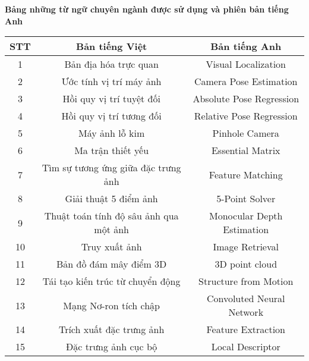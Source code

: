 \titlepage \null
	\small
	\begin{center}
	  {\bfseries Bảng những từ ngữ chuyên ngành được sử dụng và phiên bản tiếng Anh\vspace{-.5em}}
	\end{center}
	\quotation
\begin{table}[h]
\centering
\begin{tabular}{|c|c|c|}
\hline
\textbf{STT} & \textbf{Bản tiếng Việt}                & \textbf{Bản tiếng Anh}     \\ \hline
1            & Bản địa hóa trực quan                  & Visual Localization        \\ \hline
2            & Ước tính vị trí máy ảnh                & Camera Pose Estimation     \\ \hline
3            & Hồi quy vị trí tuyệt đối               & Absolute Pose Regression   \\ \hline
4            & Hồi quy vị trí tương đối               & Relative Pose Regression   \\ \hline
5            & Máy ảnh lỗ kim                         & Pinhole Camera             \\ \hline
6            & Ma trận thiết yếu                      & Essential Matrix           \\ \hline
7            & Tìm sự tương ứng giữa đặc trưng ảnh    & Feature Matching           \\ \hline
8            & Giải thuật 5 điểm ảnh                  & 5-Point Solver             \\ \hline
9            & Thuật toán tính độ sâu ảnh qua một ảnh & Monocular Depth Estimation \\ \hline
10           & Truy xuất ảnh                          & Image Retrieval            \\ \hline
11           & Bản đồ đám mây điểm 3D                          & 3D point cloud            \\ \hline
12           & Tái tạo kiến trúc từ chuyển động                          & Structure from Motion            \\ \hline
13           & Mạng Nơ-ron tích chập                         & Convoluted Neural Network           \\ \hline
14           & Trích xuất đặc trưng ảnh                         & Feature Extraction           \\ \hline
15           & Đặc trưng ảnh cục bộ                         & Local Descriptor           \\ \hline

\end{tabular}
\end{table}
